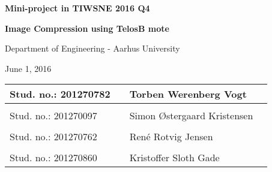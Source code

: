 
\centerline{\Huge\bfseries\color{ThemeColor} Mini-project in TIWSNE 2016 Q4}


\vspace{1em}
\centerline{\Large\bfseries\color{BlackColor} Image Compression using TelosB mote}


\vspace{5em}
\centerline{\large\bfseries\color{BlackColor}}
\centerline{\large\color{BlackColor}Department of Engineering - Aarhus University}

\vspace{0.5em}
\centerline{\large\color{BlackColor} June 1, 2016}

\vspace{25em}

\begin{center}
   \begin{tabular}{ l p{3cm} l l }
   Stud. no.: 201270782 && Torben Werenberg Vogt & \\\hline
   & & \\
   Stud. no.: 201270097 && Simon Østergaard Kristensen & \\\hline
   & & \\
   Stud. no.: 201270762 && René Rotvig Jensen & \\\hline
   & & \\
   Stud. no.: 201270860 && Kristoffer Sloth Gade & \\\hline
   \end{tabular}
\end{center}
\thispagestyle{empty} %
\restoregeometry

